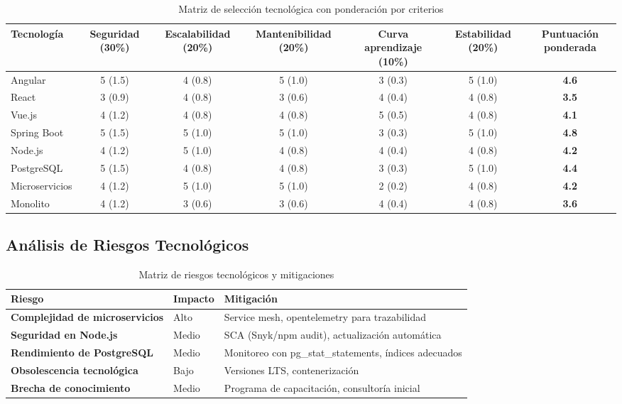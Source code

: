 \begin{table}[h]
\centering
\caption{Matriz de selección tecnológica con ponderación por criterios}
\label{tab:matriz-seleccion}
\begin{tabular}{|p{2.5cm}|c|c|c|c|c|c|}
\hline
\textbf{Tecnología} & \textbf{Seguridad (30\%)} & \textbf{Escalabilidad (20\%)} & \textbf{Mantenibilidad (20\%)} & \textbf{Curva aprendizaje (10\%)} & \textbf{Estabilidad (20\%)} & \textbf{Puntuación ponderada} \\
\hline
Angular & 5 (1.5) & 4 (0.8) & 5 (1.0) & 3 (0.3) & 5 (1.0) & \textbf{4.6} \\
\hline
React & 3 (0.9) & 4 (0.8) & 3 (0.6) & 4 (0.4) & 4 (0.8) & \textbf{3.5} \\
\hline
Vue.js & 4 (1.2) & 4 (0.8) & 4 (0.8) & 5 (0.5) & 4 (0.8) & \textbf{4.1} \\
\hline
Spring Boot & 5 (1.5) & 5 (1.0) & 5 (1.0) & 3 (0.3) & 5 (1.0) & \textbf{4.8} \\
\hline
Node.js & 4 (1.2) & 5 (1.0) & 4 (0.8) & 4 (0.4) & 4 (0.8) & \textbf{4.2} \\
\hline
PostgreSQL & 5 (1.5) & 4 (0.8) & 4 (0.8) & 3 (0.3) & 5 (1.0) & \textbf{4.4} \\
\hline
Microservicios & 4 (1.2) & 5 (1.0) & 5 (1.0) & 2 (0.2) & 4 (0.8) & \textbf{4.2} \\
\hline
Monolito & 4 (1.2) & 3 (0.6) & 3 (0.6) & 4 (0.4) & 4 (0.8) & \textbf{3.6} \\
\hline
\end{tabular}
\end{table}

\subsection{Análisis de Riesgos Tecnológicos}

\begin{table}[h]
\centering
\caption{Matriz de riesgos tecnológicos y mitigaciones}
\label{tab:riesgos}
\begin{tabular}{|p{3.5cm}|p{4cm}|p{4cm}|}
\hline
\textbf{Riesgo} & \textbf{Impacto} & \textbf{Mitigación} \\
\hline
\textbf{Complejidad de microservicios} & Alto & Service mesh, opentelemetry para trazabilidad \\
\hline
\textbf{Seguridad en Node.js} & Medio & SCA (Snyk/npm audit), actualización automática \\
\hline
\textbf{Rendimiento de PostgreSQL} & Medio & Monitoreo con pg\_stat\_statements, índices adecuados \\
\hline
\textbf{Obsolescencia tecnológica} & Bajo & Versiones LTS, contenerización \\
\hline
\textbf{Brecha de conocimiento} & Medio & Programa de capacitación, consultoría inicial \\
\hline
\end{tabular}
\end{table}

